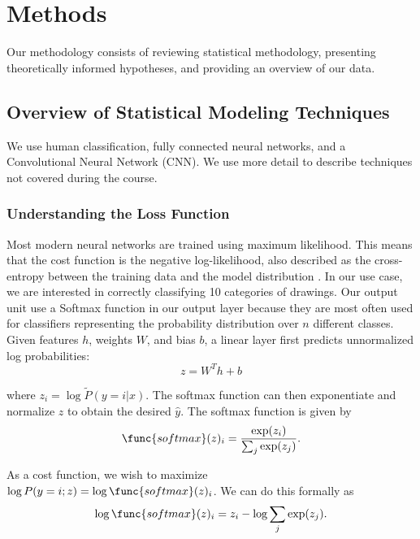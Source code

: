 \documentclass[12pt]{article}
\begin{document}
\section{Methods}

Our methodology consists of reviewing statistical methodology, presenting
theoretically informed hypotheses, and providing an overview of our data.

\subsection{Overview of Statistical Modeling Techniques}

We use human classification, fully connected neural networks,
and a Convolutional Neural Network (CNN). We use more detail to
describe techniques not covered during the course.

\subsubsection{Understanding the Loss Function}

Most modern neural networks are trained using maximum likelihood. This
means that the cost function is the negative log-likelihood, also
described as the cross-entropy between the training data and the model
distribution \cite{Goodfellow-et-al-2016}. In our use case, we are interested
in correctly classifying 10 categories of drawings. Our output unit
use a Softmax function in our output layer because they are most often
used for classifiers representing the probability distribution over
$n$ different classes. Given features $h$, weights $W$, and bias $b$, a
linear layer first predicts unnormalized log probabilities:
\begin{equation}
  z = W^Th + b 
\end{equation}

where $z_i = \log \tilde{P}(y = i | x)$. The softmax function can then
exponentiate and normalize $z$ to obtain the desired $\hat{y}$. The
softmax function is given by
\begin{equation}
  \func{softmax}(z)_i = \frac{\exp(z_i)}{\sum_j \exp(z_j)}.
\end{equation}

As a cost function, we wish to maximize
$\log P(y=i; z) = \log \func{softmax}(z)_i$. We can do this formally as
\begin{equation}
  \log \func{softmax}(z)_i = z_i - \log \sum_j \exp(z_j).
\end{equation}
\end{document}
